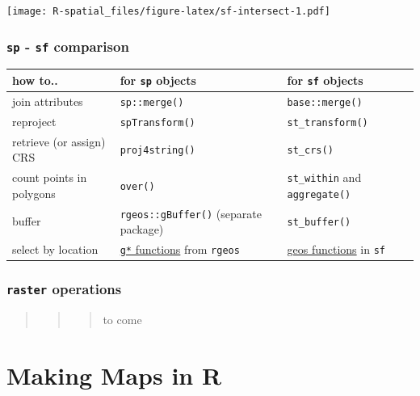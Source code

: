 \documentclass[]{book}
\theoremstyle{definition}
\theoremstyle{definition}
\theoremstyle{definition}
\theoremstyle{remark}
\begin{document}
\texttt{[image: R-spatial\_files/figure-latex/sf-intersect-1.pdf]}

\subsection{\texorpdfstring{\texttt{sp} - \texttt{sf}
comparison}{sp - sf comparison}}\label{sp---sf-comparison}

\begin{longtable}[]{@{}lll@{}}
\toprule
how to.. & for \texttt{sp} objects & for \texttt{sf}
objects\tabularnewline
\midrule
\endhead
join attributes & \texttt{sp::merge()} &
\texttt{base::merge()}\tabularnewline
reproject & \texttt{spTransform()} &
\texttt{st\_transform()}\tabularnewline
retrieve (or assign) CRS & \texttt{proj4string()} &
\texttt{st\_crs()}\tabularnewline
count points in polygons & \texttt{over()} & \texttt{st\_within} and
\texttt{aggregate()}\tabularnewline
buffer & \texttt{rgeos::gBuffer()} (separate package) &
\texttt{st\_buffer()}\tabularnewline
select by location &
\href{https://www.rdocumentation.org/packages/rgeos/}{\texttt{g*}
functions} from \texttt{rgeos} &
\href{https://www.rdocumentation.org/packages/sf/topics/geos}{geos
functions} in \texttt{sf}\tabularnewline
\bottomrule
\end{longtable}

\subsection{\texorpdfstring{\texttt{raster}
operations}{raster operations}}\label{raster-operations}

\begin{quote}
\begin{quote}
\begin{quote}
to come
\end{quote}
\end{quote}
\end{quote}

\chapter{Making Maps in R}\label{mapping}
\end{document}
